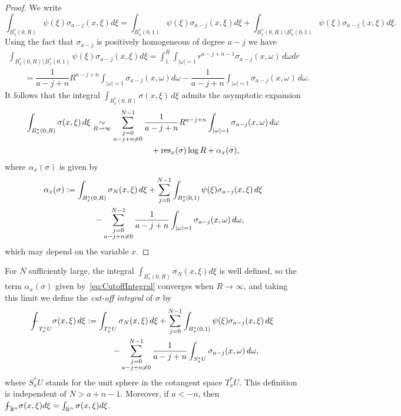 \documentclass[pdftex]{sigma}
\DeclareMathOperator{\res}{res} \DeclareMathOperator{\Res}{Res}
\begin{document}
\begin{proof}
We write
\[
\int_{B_x^*(0,R)}\psi(\xi)\sigma_{a-j}(x,\xi)d\xi=\int_{B_x^*(0,1)}\psi(\xi)\sigma_{a-j}(x,\xi)d\xi +\int_{B_x^*(0,R)\setminus B_x^*(0,1)}\psi(\xi)\sigma_{a-j}(x,\xi)d\xi.
\]
Using the fact that $\sigma_{a-j}$ is positively homogeneous of degree $a-j$ we have
\begin{gather*}
 \int_{B_x^*(0,R)\setminus B_x^*(0,1)}\psi(\xi)\sigma_{a-j}(x,\xi)d\xi=\int_1^R\int_{\vert\omega\vert=1}r^{a-j+n-1}\sigma_{a-j}(x,\omega)\,d\omega dr \\
\qquad{} =\dfrac{1}{a-j+n}R^{a-j+n} \int_{\vert\omega\vert=1}\sigma_{a-j}(x,\omega)d\omega-\dfrac{1}{a-j+n}\int_{\vert\omega\vert=1}\sigma_{a-j}(x,\omega)\,d\omega.
\end{gather*}
It follows that the integral $\int_{B_x^*(0,R)}\sigma(x,\xi)\,d\xi$ admits the asymptotic expansion
\begin{gather*}
\int_{B_x^*(0,R)}\sigma(x,\xi)\,d\xi\underset{R\to\infty}{\sim}\sum_{\substack{j=0\\a-j+n\not=0}}^{N-1} \frac{1}{a-j+n}R^{a-j+n}\int_{\vert\omega\vert=1}\sigma_{a-j}(x,\omega)\,d\omega \\
\hphantom{\int_{B_x^*(0,R)}\sigma(x,\xi)\,d\xi\underset{R\to\infty}{\sim}}{}
+{\res}_x(\sigma)\log R + \alpha_x(\sigma),
\end{gather*}
where $\alpha_x(\sigma)$ is given by
\begin{gather}
\alpha_x(\sigma) := \int_{B_x^*(0,R)}\sigma_N(x, \xi)\,d\xi+\sum_{j=0}^{N-1} \int_{B_x^*(0,1)} \psi(\xi)\sigma_{a-j}(x,\xi)\,d\xi\nonumber\\
\hphantom{\alpha_x(\sigma) :=}{}
-\sum_{\substack{j=0\\ a-j+n\not=0}}^{N-1} \dfrac{1}{a-j+n}\int_{\vert\omega\vert=1}\sigma_{a-j}(x,\omega)\,d\omega,\label{eq:CutoffIntegral}
\end{gather}
which may depend on the variable $x$.
\end{proof}

 For $N$ suf\/f\/iciently large, the integral $\int_{B_x^*(0,R)}\sigma_N(x,\xi)d\xi$ is well def\/ined, so the term $\alpha_x(\sigma)$ given by~\eqref{eq:CutoffIntegral} converges when $R\to\infty$, and taking this limit we def\/ine the \emph{cut-off integral} of $\sigma$ by
\begin{gather*}
{-\hskip -11,5pt\int}_{T^{*}_xU}\sigma(x,\xi)\,d\xi :=\int_{T^{*}_xU}\sigma_N(x,\xi)\,d\xi+\sum_{j=0}^{N-1} \int_{B^{*}_x(0,1)}\psi(\xi)\sigma_{a-j}(x,\xi)\,d\xi\\
\hphantom{{-\hskip -11,5pt\int}_{T^{*}_xU}\sigma(x,\xi)\,d\xi :=}{}  -\sum_{\substack{j=0\\ a-j+n\not=0}}^{N-1}\dfrac{1}{a-j+n}\int_{S^{*}_xU}\sigma_{a-j}(x,\omega)\,d\omega,
\end{gather*}
where $S^{*}_xU$ stands for the unit sphere in the cotangent space $T^{*}_xU$. This def\/inition is independent of $N>a+n-1$. Moreover, if $a<-n$, then ${-\hskip -10pt\int}_{\mathbb{R}^n}\sigma(x,\xi)d\xi=\int_{\mathbb{R}^n}\sigma(x,\xi)d\xi$.
\end{document}
